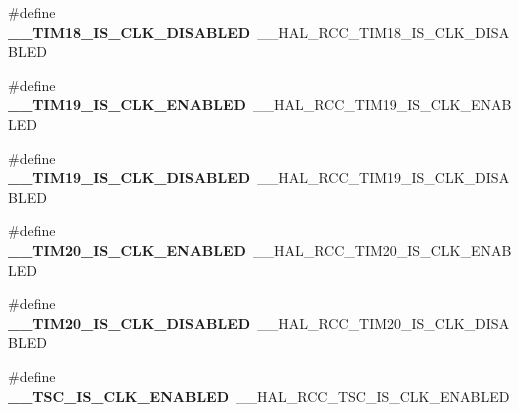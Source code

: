 \begin{DoxyCompactItemize}
\item 
\hypertarget{group___h_a_l___r_c_c___aliased_ga4d9c249dc0f822a21b7ebe77f6f9c091}{\#define {\bfseries \-\_\-\-\_\-\-T\-I\-M18\-\_\-\-I\-S\-\_\-\-C\-L\-K\-\_\-\-D\-I\-S\-A\-B\-L\-E\-D}~\-\_\-\-\_\-\-H\-A\-L\-\_\-\-R\-C\-C\-\_\-\-T\-I\-M18\-\_\-\-I\-S\-\_\-\-C\-L\-K\-\_\-\-D\-I\-S\-A\-B\-L\-E\-D}\label{group___h_a_l___r_c_c___aliased_ga4d9c249dc0f822a21b7ebe77f6f9c091}

\item 
\hypertarget{group___h_a_l___r_c_c___aliased_ga71f720ee852e32bd677cb76758e1a2d6}{\#define {\bfseries \-\_\-\-\_\-\-T\-I\-M19\-\_\-\-I\-S\-\_\-\-C\-L\-K\-\_\-\-E\-N\-A\-B\-L\-E\-D}~\-\_\-\-\_\-\-H\-A\-L\-\_\-\-R\-C\-C\-\_\-\-T\-I\-M19\-\_\-\-I\-S\-\_\-\-C\-L\-K\-\_\-\-E\-N\-A\-B\-L\-E\-D}\label{group___h_a_l___r_c_c___aliased_ga71f720ee852e32bd677cb76758e1a2d6}

\item 
\hypertarget{group___h_a_l___r_c_c___aliased_ga612107385d789986a2200f18f05bfc9f}{\#define {\bfseries \-\_\-\-\_\-\-T\-I\-M19\-\_\-\-I\-S\-\_\-\-C\-L\-K\-\_\-\-D\-I\-S\-A\-B\-L\-E\-D}~\-\_\-\-\_\-\-H\-A\-L\-\_\-\-R\-C\-C\-\_\-\-T\-I\-M19\-\_\-\-I\-S\-\_\-\-C\-L\-K\-\_\-\-D\-I\-S\-A\-B\-L\-E\-D}\label{group___h_a_l___r_c_c___aliased_ga612107385d789986a2200f18f05bfc9f}

\item 
\hypertarget{group___h_a_l___r_c_c___aliased_ga295f0f8b21ce49903a7cf27a7185f8c5}{\#define {\bfseries \-\_\-\-\_\-\-T\-I\-M20\-\_\-\-I\-S\-\_\-\-C\-L\-K\-\_\-\-E\-N\-A\-B\-L\-E\-D}~\-\_\-\-\_\-\-H\-A\-L\-\_\-\-R\-C\-C\-\_\-\-T\-I\-M20\-\_\-\-I\-S\-\_\-\-C\-L\-K\-\_\-\-E\-N\-A\-B\-L\-E\-D}\label{group___h_a_l___r_c_c___aliased_ga295f0f8b21ce49903a7cf27a7185f8c5}

\item 
\hypertarget{group___h_a_l___r_c_c___aliased_ga4507c4cdece09b9b9819081d451cd1c9}{\#define {\bfseries \-\_\-\-\_\-\-T\-I\-M20\-\_\-\-I\-S\-\_\-\-C\-L\-K\-\_\-\-D\-I\-S\-A\-B\-L\-E\-D}~\-\_\-\-\_\-\-H\-A\-L\-\_\-\-R\-C\-C\-\_\-\-T\-I\-M20\-\_\-\-I\-S\-\_\-\-C\-L\-K\-\_\-\-D\-I\-S\-A\-B\-L\-E\-D}\label{group___h_a_l___r_c_c___aliased_ga4507c4cdece09b9b9819081d451cd1c9}

\item 
\hypertarget{group___h_a_l___r_c_c___aliased_ga688b5814881327ab38b80de587427a83}{\#define {\bfseries \-\_\-\-\_\-\-T\-S\-C\-\_\-\-I\-S\-\_\-\-C\-L\-K\-\_\-\-E\-N\-A\-B\-L\-E\-D}~\-\_\-\-\_\-\-H\-A\-L\-\_\-\-R\-C\-C\-\_\-\-T\-S\-C\-\_\-\-I\-S\-\_\-\-C\-L\-K\-\_\-\-E\-N\-A\-B\-L\-E\-D}\label{group___h_a_l___r_c_c___aliased_ga688b5814881327ab38b80de587427a83}


\end{DoxyCompactItemize}
